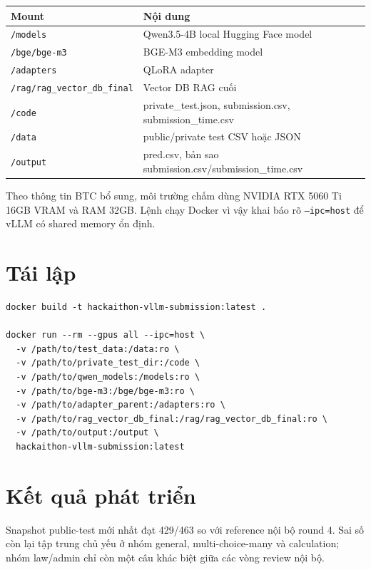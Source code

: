 \documentclass[12pt,a4paper]{article}
\begin{document}
\begin{center}
\begin{tabular}{ll}
\toprule
Mount & Nội dung \\
\midrule
\texttt{/models} & Qwen3.5-4B local Hugging Face model \\
\texttt{/bge/bge-m3} & BGE-M3 embedding model \\
\texttt{/adapters} & QLoRA adapter \\
\texttt{/rag/rag\_vector\_db\_final} & Vector DB RAG cuối \\
\texttt{/code} & private\_test.json, submission.csv, submission\_time.csv \\
\texttt{/data} & public/private test CSV hoặc JSON \\
\texttt{/output} & pred.csv, bản sao submission.csv/submission\_time.csv \\
\bottomrule
\end{tabular}
\end{center}

Theo thông tin BTC bổ sung, môi trường chấm dùng NVIDIA RTX 5060 Ti 16GB
VRAM và RAM 32GB. Lệnh chạy Docker vì vậy khai báo rõ \texttt{--ipc=host}
để vLLM có shared memory ổn định.

\section{Tái lập}

\begin{verbatim}
docker build -t hackaithon-vllm-submission:latest .

docker run --rm --gpus all --ipc=host \
  -v /path/to/test_data:/data:ro \
  -v /path/to/private_test_dir:/code \
  -v /path/to/qwen_models:/models:ro \
  -v /path/to/bge-m3:/bge/bge-m3:ro \
  -v /path/to/adapter_parent:/adapters:ro \
  -v /path/to/rag_vector_db_final:/rag/rag_vector_db_final:ro \
  -v /path/to/output:/output \
  hackaithon-vllm-submission:latest
\end{verbatim}

\section{Kết quả phát triển}

Snapshot public-test mới nhất đạt 429/463 so với reference nội bộ round 4.
Sai số còn lại tập trung chủ yếu ở nhóm general, multi-choice-many và
calculation; nhóm law/admin chỉ còn một câu khác biệt giữa các vòng review nội
bộ.
\end{document}
